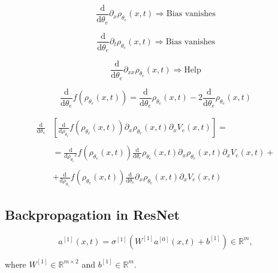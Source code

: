 \begin{equation*}
    \frac{\mathrm{d}}{\mathrm{d} \theta_e} \partial_x \rho_{\theta_e}(x, t) \Rightarrow \text{Bias vanishes}
\end{equation*}

\begin{equation*}
    \frac{\mathrm{d}}{\mathrm{d} \theta_e} \partial_t \rho_{\theta_e}(x, t) \Rightarrow \text{Bias vanishes}
\end{equation*}

\begin{equation*}
    \frac{\mathrm{d}}{\mathrm{d} \theta_e} \partial_{xx} \rho_{\theta_e}(x, t) \Rightarrow \text{Help}
\end{equation*}

\begin{equation*}
    \frac{\mathrm{d}}{\mathrm{d} \theta_e} f(\rho_{\theta_e}(x, t)) = \frac{\mathrm{d}}{\mathrm{d} \theta_e} \rho_{\theta_e}(x, t) - 2 \frac{\mathrm{d}}{\mathrm{d} \theta_e} \rho_{\theta_e}(x, t)
\end{equation*}

\begin{align*}
    \frac{\mathrm{d}}{\mathrm{d} \theta_e} & [\frac{\mathrm{d}}{\mathrm{d} \rho_{\theta_e}} f(\rho_{\theta_e}(x, t)) \partial_x \rho_{\theta_e}(x, t) \partial_x V_e(x, t)] = \\
    \\ \quad & = \frac{\mathrm{d}}{\mathrm{d} {\rho_{\theta_e}}^2} f(\rho_{\theta_e}(x, t)) \frac{\mathrm{d}}{\mathrm{d} \theta_e} \rho_{\theta_e}(x, t) \partial_x \rho_{\theta_e}(x, t) \partial_x V_e(x, t) + \\
    \\ \quad & + \frac{\mathrm{d}}{\mathrm{d} \rho_{\theta_e}} f(\rho_{\theta_e}(x, t)) \frac{\mathrm{d}}{\mathrm{d} \theta_e} \partial_x \rho_{\theta_e}(x, t) \partial_x V_e(x, t)
\end{align*}



\subsection{Backpropagation in ResNet}

\begin{equation*}
    a^{[1]}(x,t) = \sigma^{[1]} (W^{[1]} a^{[0]}(x,t) + b^{[1]}) \in \mathbb{R}^{m}, 
\end{equation*}

where $W^{[1]} \in \mathbb{R}^{m \times 2}$ and $b^{[1]} \in \mathbb{R}^{m}$.

